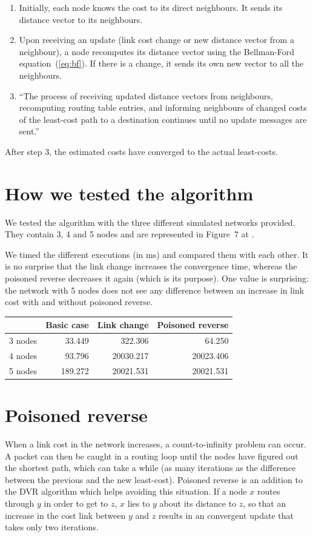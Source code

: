 \documentclass[12pt,a4paper]{article}
\begin{document}
\begin{enumerate}
\item Initially, each node knows the cost to its direct neighbours. It sends its distance vector to its neighbours.

\item Upon receiving an update (link cost change or new distance vector from a neighbour), a node recomputes its distance vector using the Bellman-Ford equation~(\ref{eq:bf}). If there is a change, it sends its own new vector to all the neighbours.

\item ``The process of receiving updated distance vectors from neighbours, recomputing routing table entries, and informing neighbours of changed costs of the least-cost path to a destination continues until no update messages are sent.''~\cite[p.~375]{cn}
\end{enumerate}

After step 3, the estimated costs have converged to the actual least-costs.

\section{How we tested the algorithm}
We tested the algorithm  with the three different simulated networks provided. They contain 3, 4 and 5 nodes and are represented in Figure~7 at \cite{lab}.

We timed the different executions (in ms) and compared them with each other.
It is no surprise that the link change increases the convergence time, whereas the poisoned reverse decreases it again (which is its purpose). One value is surprising: the network with 5 nodes does not see any difference between an increase in link cost with and without poisoned reverse.
\begin{table}[!ht]
\centering
\begin{tabular}{l||r|r|r}
        &  Basic case         & Link change        &  Poisoned reverse\\
        \hline
        \hline
3 nodes &  33.449  & 322.306   & 64.250 \\
4 nodes &  93.796  & 20030.217 & 20023.406 \\
5 nodes &  189.272 & 20021.531 & 20021.531 \\
\end{tabular}
\end{table}

\section{Poisoned reverse}
When a link cost in the network increases, a count-to-infinity problem can occur. A packet can then be caught in a routing loop until the nodes have figured out the shortest path, which can take a while (as many iterations as the difference between the previous and the new least-cost). Poisoned reverse is an addition to the DVR algorithm which helps avoiding this situation. If a node $x$ routes through $y$ in order to get to $z$, $x$ lies to $y$ about its distance to $z$, so that an increase in the cost link between $y$ and $z$ results in an convergent update that takes only two iterations. 
\end{document}
